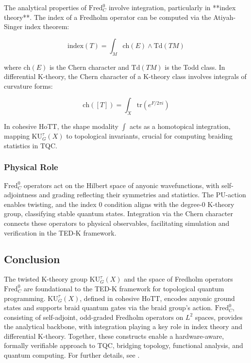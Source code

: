 \documentclass{article}
\theoremstyle{definition}
\begin{document}
The analytical properties of \(\text{Fred}^0_C\) involve integration, particularly in **index theory**. The index of a Fredholm operator can be computed via the Atiyah-Singer index theorem:

\begin{equation}
\text{index}(T) = \int_M \text{ch}(E) \wedge \text{Td}(TM)
\end{equation}

where \(\text{ch}(E)\) is the Chern character and \(\text{Td}(TM)\) is the Todd class. In differential K-theory, the Chern character of a K-theory class involves integrals of curvature forms:

\begin{equation}
\text{ch}([T]) = \int_X \text{tr}(e^{F/2\pi i})
\end{equation}

In cohesive HoTT, the shape modality \(\int\) acts as a homotopical integration, mapping \(\mathrm{KU}^\tau_G(X)\) to topological invariants, crucial for computing braiding statistics in TQC.

\subsubsection{Physical Role}

\(\text{Fred}^0_C\) operators act on the Hilbert space of anyonic wavefunctions, with self-adjointness and grading reflecting their symmetries and statistics. The \(\mathrm{PU}\)-action enables twisting, and the index 0 condition aligns with the degree-0 K-theory group, classifying stable quantum states. Integration via the Chern character connects these operators to physical observables, facilitating simulation and verification in the TED-K framework.

\subsection{Conclusion}

The twisted K-theory group \(\mathrm{KU}^\tau_G(X)\) and the space of Fredholm operators \(\text{Fred}^0_C\) are foundational to the TED-K framework for topological quantum programming. \(\mathrm{KU}^\tau_G(X)\), defined in cohesive HoTT, encodes anyonic ground states and supports braid quantum gates via the braid group’s action. \(\text{Fred}^0_C\), consisting of self-adjoint, odd-graded Fredholm operators on \(L^2\) spaces, provides the analytical backbone, with integration playing a key role in index theory and differential K-theory. Together, these constructs enable a hardware-aware, formally verifiable approach to TQC, bridging topology, functional analysis, and quantum computing. For further details, see \cite{SatiSchreiber2022Supplementary}.
\end{document}
